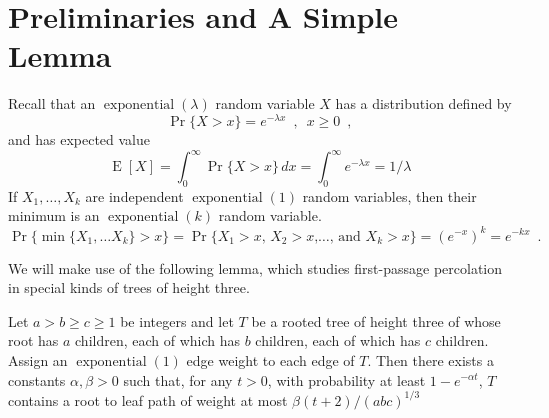 \documentclass[a4paper,UKenglish]{lipics-v2016}
\DeclareMathOperator{\E}{E}
\DeclareMathOperator{\exponential}{exponential}
\begin{document}
\section{Preliminaries and A Simple Lemma}

Recall that an $\exponential(\lambda)$ random variable $X$ has a distribution defined by
\[
   \Pr\{X > x\} = e^{-\lambda x} \enspace,\enspace x \ge 0 \enspace ,
\]
and has expected value
\[
   \E[X] = \int_0^\infty \Pr\{X>x\}\,dx = \int_0^\infty e^{-\lambda x} = 1/\lambda
\]
If $X_1,\ldots,X_k$ are independent $\exponential(1)$ random variables, then their minimum is an $\exponential(k)$ random variable.
\[
   \Pr\{\min\{X_1,\ldots X_k\} > x\} = \Pr\{\text{$X_1>x$, $X_2>x$,\ldots, and $X_k>x$}\} = \left(e^{-x}\right)^k = e^{-kx} \enspace .
\]

We will make use of the following lemma, which studies first-passage percolation in special kinds of trees of height three.

\begin{lemma}\label{lem:abc}
Let $a>b\ge c\ge 1$ be integers and let $T$ be a rooted tree of height
three of whose root has $a$ children, each of which has $b$ children,
each of which has $c$ children.  Assign an $\exponential(1)$ edge weight
to each edge of $T$.  Then there exists a constants $\alpha,\beta>0$ such that, for any $t>0$, with probability at least $1-e^{-\alpha t}$, $T$
contains a root to leaf path of weight at most $\beta(t+2)/(abc)^{1/3}$
\end{lemma}
\end{document}
